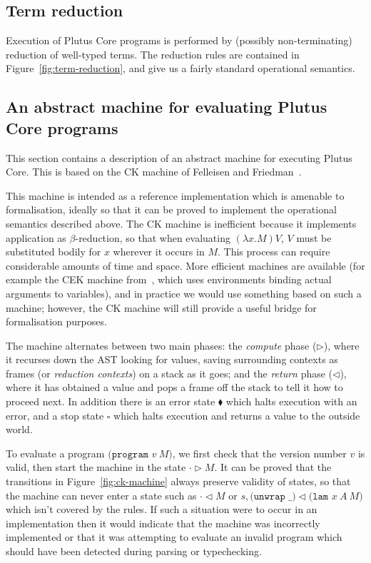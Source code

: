\documentclass[a4paper]{article}
\begin{document}



\newpage
\subsection{Term reduction}
Execution of Plutus Core programs is performed by (possibly
non-terminating) reduction of well-typed terms.  The reduction rules
are contained in Figure~\ref{fig:term-reduction}, and give us a fairly
standard operational semantics.



\subsection{An abstract machine for evaluating Plutus Core programs}
This section contains a description of an abstract machine for
executing Plutus Core.  This is based on the CK machine of Felleisen
and Friedman~\citep{Felleisen-CK-CEK}.

This machine is intended as a reference implementation which is
amenable to formalisation, ideally so that it can be proved to
implement the operational semantics described above.  The CK machine
is inefficient because it implements application as $\beta$-reduction,
so that when evaluating $(\lambda x.M)V$, $V$ must be substituted
bodily for $x$ wherever it occurs in $M$.  This process can require
considerable amounts of time and space.  More efficient machines are
available (for example the CEK machine from~\citep{Felleisen-CK-CEK},
which uses environments binding actual arguments to variables), and in
practice we would use something based on such a machine; however, the
CK machine will still provide a useful bridge for formalisation
purposes.



\noindent The machine alternates between two main phases: the
\textit{compute} phase ($\triangleright$), where it recurses down
the AST looking for values, saving surrounding contexts as frames (or
\textit{reduction contexts}) on a stack as it goes; and the
\textit{return} phase ($\triangleleft$), where it has obtained a value and
pops a frame off the stack to tell it how to proceed next.  In
addition there is an error state $\blacklozenge$ which halts execution
with an error, and a stop state $\square$ which halts execution and
returns a value to the outside world.

To evaluate a program $\texttt{(program } v\ M \texttt{)}$, we first
check that the version number $v$ is valid, then start the machine in
the state $\cdot \triangleright M$.  It can be proved that the
transitions in Figure~\ref{fig:ck-machine} always preserve
validity of states, so that the machine can never enter a state such as
  $\cdot \triangleleft M$
or
$s, \texttt{(unwrap \_)} \triangleleft \texttt{(lam }x\ A \ M\texttt{)}$
which isn't covered by the rules.  If such a
situation were to occur in an implementation then it would indicate
that the machine was incorrectly implemented or that it was attempting
to evaluate an invalid program which should have been detected during
parsing or typechecking.
\end{document}
